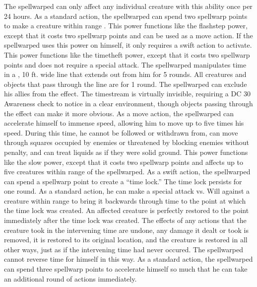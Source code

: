 The spellwarped can only affect any individual creature with this ability once per 24 hours.
As a standard action, the spellwarped can spend two spellwarp points to make a creature within \rngmed range \slowed.
This power functions like the flashstep power, except that it costs two spellwarp points and can be used as a move action.
If the spellwarped uses this power on himself, it only requires a swift action to activate.
This power functions like the timetheft power, except that it costs two spellwarp points and does not require a special attack.
The spellwarped manipulates time in a \arealarge, 10 ft.
wide line that extends out from him for 5 rounds.
All creatures and objects that pass through the line are \slowed for 1 round.
The spellwarped can exclude his allies from the effect.
The timestream is virtually invisible, requiring a DC 30 Awareness check to notice in a clear environment, though objects passing through the effect can make it more obvious.
As a move action, the spellwarped can accelerate himself to immense speed, allowing him to move up to five times his speed.
During this time, he cannot be followed or withdrawn from, can move through squares occupied by enemies or threatened by blocking enemies without penalty, and can treat liquids as if they were solid ground.
This power functions like the slow power, except that it costs two spellwarp points and affects up to five creatures within \rngclose range of the spellwarped.
As a swift action, the spellwarped can spend a spellwarp point to create a ``time lock.'' The time lock persists for one round.
As a standard action, he can make a special attack vs. Will against a creature within \rngmed range to bring it backwards through time to the point at which the time lock was created.
An affected creature is perfectly restored to the point immediately after the time lock was created.
The effects of any actions that the creature took in the intervening time are undone, any damage it dealt or took is removed, it is restored to its original location, and the creature is restored in all other ways, just as if the intervening time had never occured.
The spellwarped cannot reverse time for himself in this way.
As a standard action, the spellwarped can spend three spellwarp points to accelerate himself so much that he can take an additional round of actions immediately.
